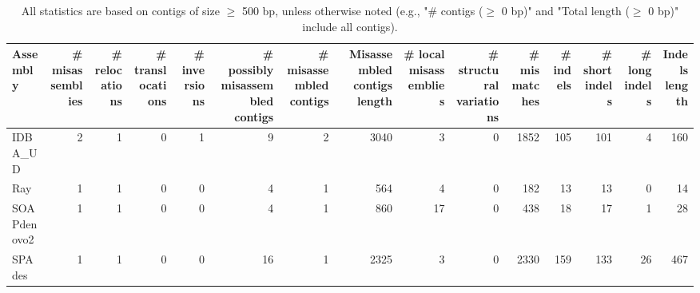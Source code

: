 \documentclass[12pt,a4paper]{article}
\begin{document}
\begin{table}[ht]
\begin{center}
\caption{All statistics are based on contigs of size $\geq$ 500 bp, unless otherwise noted (e.g., "\# contigs ($\geq$ 0 bp)" and "Total length ($\geq$ 0 bp)" include all contigs).}
\begin{tabular}{|l*{14}{|r}|}
\hline
Assembly & \# misassemblies &     \# relocations &     \# translocations &     \# inversions & \# possibly misassembled contigs & \# misassembled contigs & Misassembled contigs length & \# local misassemblies & \# structural variations & \# mismatches & \# indels &     \# short indels &     \# long indels & Indels length \\ \hline
IDBA\_UD & 2 & 1 & 0 & 1 & 9 & 2 & 3040 & 3 & 0 & 1852 & 105 & 101 & 4 & 160 \\ \hline
Ray & 1 & 1 & 0 & 0 & 4 & 1 & 564 & 4 & 0 & 182 & 13 & 13 & 0 & 14 \\ \hline
SOAPdenovo2 & 1 & 1 & 0 & 0 & 4 & 1 & 860 & 17 & 0 & 438 & 18 & 17 & 1 & 28 \\ \hline
SPAdes & 1 & 1 & 0 & 0 & 16 & 1 & 2325 & 3 & 0 & 2330 & 159 & 133 & 26 & 467 \\ \hline
\end{tabular}
\end{center}
\end{table}
\end{document}
